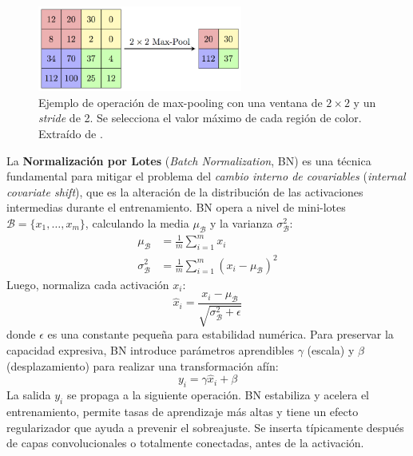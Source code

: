 \documentclass[11pt,spanish,listoffigures,listoftables]{tfgetsinf}
\begin{document}
\begin{figure}[H]
   \centering
   \includegraphics[width=0.6\textwidth]{images/estado_del_arte/max_pooling.png}
   \caption[Ejemplo de operación de max-pooling con una ventana de $2 \times 2$ y un \textit{stride} de 2]{Ejemplo de operación de max-pooling con una ventana de $2 \times 2$ y un \textit{stride} de 2. Se selecciona el valor máximo de cada región de color. Extraído de \cite{csWikiMaxpoolSample}.}
   \label{fig:pooling}
\end{figure}

La \textbf{Normalización por Lotes} (\textit{Batch Normalization}, BN) es una técnica fundamental para mitigar el problema del \textit{cambio interno de covariables} (\textit{internal covariate shift}), que es la alteración de la distribución de las activaciones intermedias durante el entrenamiento. BN opera a nivel de mini-lotes $\mathcal{B} = \{x_1, \dots, x_m\}$, calculando la media $\mu_{\mathcal{B}}$ y la varianza $\sigma^2_{\mathcal{B}}$:
\begin{align}
   \mu_{\mathcal{B}} &= \frac{1}{m} \sum_{i=1}^{m} x_i \\
   \sigma^2_{\mathcal{B}} &= \frac{1}{m} \sum_{i=1}^{m} (x_i - \mu_{\mathcal{B}})^2
\end{align}
Luego, normaliza cada activación $x_i$:
\begin{equation}
   \hat{x}_i = \frac{x_i - \mu_{\mathcal{B}}}{\sqrt{\sigma^2_{\mathcal{B}} + \epsilon}}
\end{equation}
donde $\epsilon$ es una constante pequeña para estabilidad numérica. Para preservar la capacidad expresiva, BN introduce parámetros aprendibles $\gamma$ (escala) y $\beta$ (desplazamiento) para realizar una transformación afín:
\begin{equation}
   y_i = \gamma \hat{x}_i + \beta
\end{equation}
La salida $y_i$ se propaga a la siguiente operación. BN estabiliza y acelera el entrenamiento, permite tasas de aprendizaje más altas y tiene un efecto regularizador que ayuda a prevenir el sobreajuste. Se inserta típicamente después de capas convolucionales o totalmente conectadas, antes de la activación.
\end{document}
